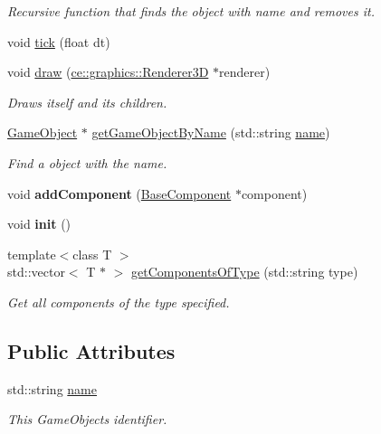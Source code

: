 \begin{DoxyCompactItemize}
\begin{DoxyCompactList}\small\item\em Recursive function that finds the object with name and removes it. \end{DoxyCompactList}\item 
void \hyperlink{classce_1_1game_1_1_game_object_aa77b42484f1a5c0abf1d4bf1564becac}{tick} (float dt)
\item 
void \hyperlink{classce_1_1game_1_1_game_object_ad5e81a50f4472e7557ec949eb3cc9413}{draw} (\hyperlink{classce_1_1graphics_1_1_renderer3_d}{ce\+::graphics\+::\+Renderer3D} $\ast$renderer)
\begin{DoxyCompactList}\small\item\em Draws itself and its children. \end{DoxyCompactList}\item 
\hyperlink{classce_1_1game_1_1_game_object}{Game\+Object} $\ast$ \hyperlink{classce_1_1game_1_1_game_object_a2fcc1608d7c352ba88a5fcc5d99eb5e2}{get\+Game\+Object\+By\+Name} (std\+::string \hyperlink{classce_1_1game_1_1_game_object_a1de1f674c70df3bbba6aefb938ad8f32}{name})
\begin{DoxyCompactList}\small\item\em Find a object with the name. \end{DoxyCompactList}\item 
\mbox{\label{classce_1_1game_1_1_game_object_aff7595869f54126ae6fd16d38870f7a0}} 
void {\bfseries add\+Component} (\hyperlink{classce_1_1game_1_1_base_component}{Base\+Component} $\ast$component)
\item 
\mbox{\label{classce_1_1game_1_1_game_object_ac4f59a89b96dffe070a928f64ddfe382}} 
void {\bfseries init} ()
\item 
{\footnotesize template$<$class T $>$ }\\std\+::vector$<$ T $\ast$ $>$ \hyperlink{classce_1_1game_1_1_game_object_ac2597ef42f7b375013b744c6a7d65499}{get\+Components\+Of\+Type} (std\+::string type)
\begin{DoxyCompactList}\small\item\em Get all components of the type specified. \end{DoxyCompactList}\end{DoxyCompactItemize}
\subsection*{Public Attributes}
\begin{DoxyCompactItemize}
\item 
\mbox{\label{classce_1_1game_1_1_game_object_a1de1f674c70df3bbba6aefb938ad8f32}} 
std\+::string \hyperlink{classce_1_1game_1_1_game_object_a1de1f674c70df3bbba6aefb938ad8f32}{name}
\begin{DoxyCompactList}\small\item\em This Game\+Objects identifier. \end{DoxyCompactList}\end{DoxyCompactItemize}
